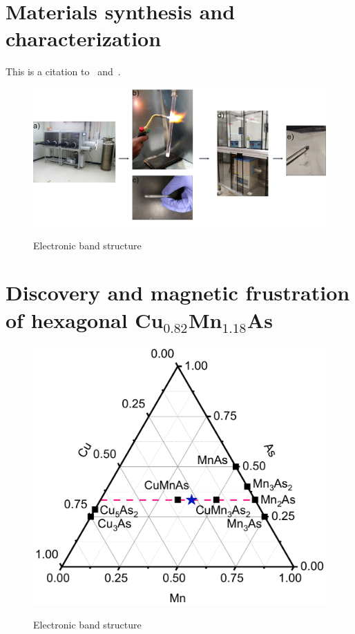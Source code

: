 \documentclass[11pt,edeposit,draftthesis]{uiucthesis2020}
\begin{document}
\begin{mainmatter}
\Blindtext[6]

\chapter{Materials synthesis and characterization}

This is a citation to~\cite{Walker2015} and~\cite{Hager2006}.

\begin{figure}
\centering\includegraphics[width=\columnwidth]{figures/ch4/synthesis_procedure.png} \\
\caption{\label{fig:synthesis_procedure}
Electronic band structure
}
\end{figure}

\chapter{Discovery and magnetic frustration of hexagonal Cu$_{0.82}$Mn$_{1.18}$As}

\begin{figure}
\centering\includegraphics[width=\columnwidth]{figures/ch5/phase_diagram_cropped.pdf} \\
\caption{\label{fig:phase_diagram}
Electronic band structure
}
\end{figure}


\end{mainmatter}
\end{document}
